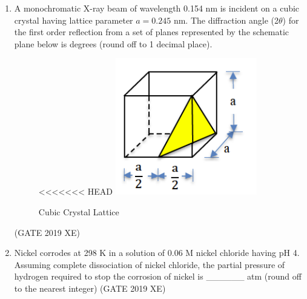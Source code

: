 \documentclass[journal,12pt,onecolumn]{IEEEtran}
\begin{document}
\begin{enumerate}
\begin{multicols}{2}
<<<<<<< HEAD
\end{multicols}

\newpage
=======

\vspace{0.5cm}
>>>>>>> d734831 (Assignment)

\item A monochromatic X-ray beam of wavelength 0.154 nm is incident on a cubic crystal having lattice parameter $a=0.245$ nm. The diffraction angle (2$\theta$) for the first order reflection from a set of planes represented by the schematic plane below is \underline{\hspace{2cm}} degrees (round off to 1 decimal place).

\begin{figure}[htbp]
  \centering
<<<<<<< HEAD
  \includegraphics[width=.5\columnwidth]{figs/C/fig1.png} 
  \caption{Cubic Crystal Lattice}
  \label{fig:figs/C/fig1.png}
\end{figure}

\hfill{(GATE 2019 XE)} \\


\item Nickel corrodes at 298 K in a solution of 0.06 M nickel chloride having pH 4. Assuming complete dissociation of nickel chloride, the partial pressure of hydrogen required to stop the corrosion of nickel is \_\_\_\_\_\_ atm (round off to the nearest integer)
\hfill{(GATE 2019 XE)} \\



\end{enumerate}
\end{document}
